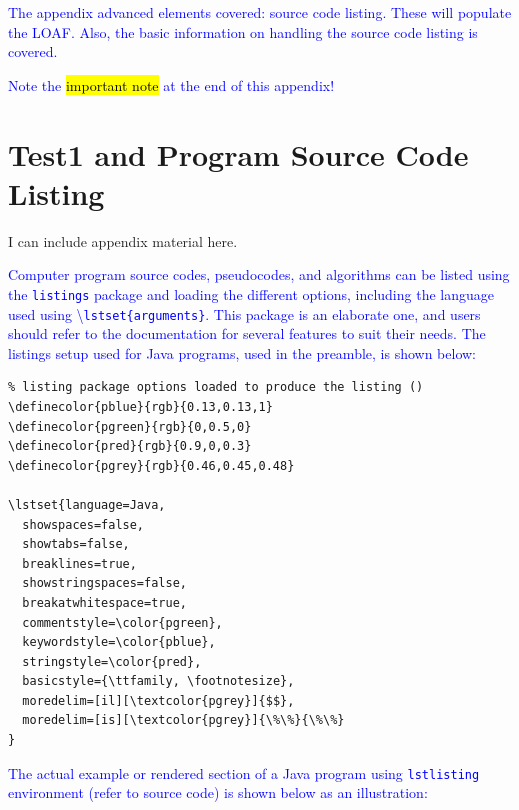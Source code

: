 \documentclass[phd,showframe]{ndsu-thesis-2022}
\newcommand\italk[1]{\textcolor{blue}{#1}}  %
\newcommand\cmd[1]{\textbackslash\texttt{#1}}  %
\newcommand\vb[1]{\textcolor{blue}{\texttt{#1}}}%
\begin{document}
\italk{The appendix advanced elements covered: source code listing. These will populate the LOAF. Also, the basic information on handling the source code listing is covered. }

\italk{Note the \hl{important note} at the end of this appendix!}

\section{Test1 and Program Source Code Listing}
I can include appendix material here. \kant[9] 

\italk{Computer program source codes, pseudocodes, and algorithms can be listed using the \vb{listings} package and loading the different options, including the language used using \cmd{lstset\{arguments\}}. This package is an elaborate one, and users should refer to the documentation for several features to suit their needs. The listings setup used for Java programs, used in the preamble, is shown below:}

{\small
\singlespacing
\begin{verbatim}
% listing package options loaded to produce the listing ()
\definecolor{pblue}{rgb}{0.13,0.13,1}
\definecolor{pgreen}{rgb}{0,0.5,0}
\definecolor{pred}{rgb}{0.9,0,0.3}
\definecolor{pgrey}{rgb}{0.46,0.45,0.48}

\lstset{language=Java, 
  showspaces=false,
  showtabs=false,
  breaklines=true,
  showstringspaces=false,
  breakatwhitespace=true,
  commentstyle=\color{pgreen},
  keywordstyle=\color{pblue},
  stringstyle=\color{pred},
  basicstyle={\ttfamily, \footnotesize},
  moredelim=[il][\textcolor{pgrey}]{$$},
  moredelim=[is][\textcolor{pgrey}]{\%\%}{\%\%}
}
\end{verbatim}
}



\italk{The actual example or rendered section of a Java program using \vb{lstlisting} environment (refer to source code) is shown below as an illustration:}
\end{document}
